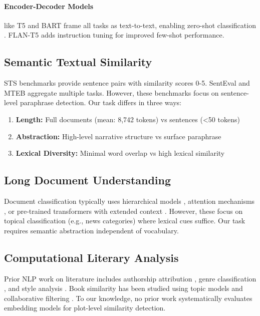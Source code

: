 \documentclass[11pt]{article}
\begin{document}
\paragraph{Encoder-Decoder Models} like T5 \cite{Raffel2020T5} and BART \cite{Lewis2020BART} frame all tasks as text-to-text, enabling zero-shot classification \cite{Sanh2022Multitask}. FLAN-T5 \cite{Chung2022FLAN} adds instruction tuning for improved few-shot performance.

\subsection{Semantic Textual Similarity}

STS benchmarks \cite{Cer2017SemEval,Agirre2016SemEval} provide sentence pairs with similarity scores 0-5. SentEval \cite{Conneau2018SentEval} and MTEB \cite{Muennighoff2023MTEB} aggregate multiple tasks. However, these benchmarks focus on sentence-level paraphrase detection. Our task differs in three ways:

\begin{enumerate}
    \item \textbf{Length:} Full documents (mean: 8,742 tokens) vs sentences (<50 tokens)
    \item \textbf{Abstraction:} High-level narrative structure vs surface paraphrase
    \item \textbf{Lexical Diversity:} Minimal word overlap vs high lexical similarity
\end{enumerate}

\subsection{Long Document Understanding}

Document classification typically uses hierarchical models \cite{Yang2016HAN}, attention mechanisms \cite{Guo2019StarTransformer}, or pre-trained transformers with extended context \cite{Beltagy2020Longformer,Zaheer2020BigBird}. However, these focus on topical classification (e.g., news categories) where lexical cues suffice. Our task requires semantic abstraction independent of vocabulary.

\subsection{Computational Literary Analysis}

Prior NLP work on literature includes authorship attribution \cite{Stamatatos2009Authorship}, genre classification \cite{Underwood2019DistantHorizons}, and style analysis \cite{Hughes2012Quantitative}. Book similarity has been studied using topic models \cite{Jockers2013Macroanalysis} and collaborative filtering \cite{Wan2018ItemRecommendation}. To our knowledge, no prior work systematically evaluates embedding models for plot-level similarity detection.
\end{document}
